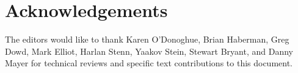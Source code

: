 \chapter{Acknowledgements}
\label{section-17}

The editors would like to thank Karen O'Donoghue, Brian Haberman,
Greg Dowd, Mark Elliot, Harlan Stenn, Yaakov Stein, Stewart Bryant,
and Danny Mayer for technical reviews and specific text contributions
to this document.

